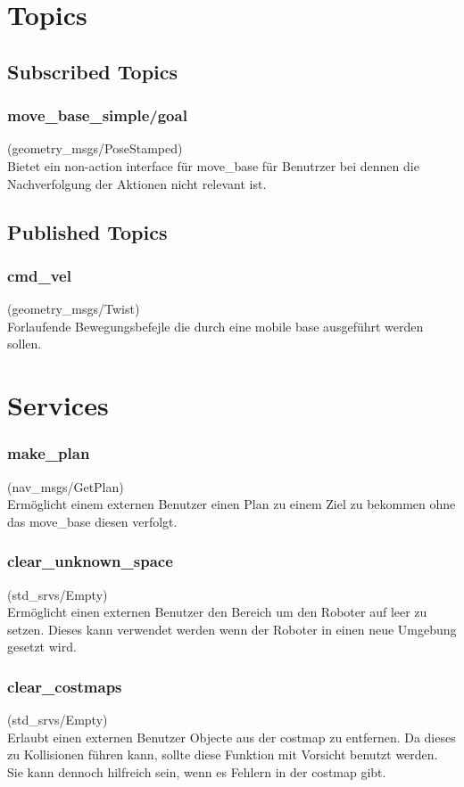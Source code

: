 \documentclass[oribibl]{llncs}
\begin{document}
\section{Topics}
\subsection{Subscribed Topics}
\subsubsection{move\_base\_simple/goal} (geometry\_msgs/PoseStamped)\\
	Bietet ein non-action interface für move\_base für Benutrzer bei dennen die Nachverfolgung der Aktionen nicht relevant ist.
\subsection{Published Topics}
\subsubsection{cmd\_vel} (geometry\_msgs/Twist)\\
	Forlaufende Bewegungsbefejle die durch eine mobile base ausgeführt werden 	sollen.
	
\section{Services}
\subsubsection{make\_plan} (nav\_msgs/GetPlan)\\
	Ermöglicht einem externen Benutzer einen Plan zu einem Ziel zu bekommen ohne 	das move\_base diesen verfolgt.
\subsubsection{clear\_unknown\_space} (std\_srvs/Empty)\\
	Ermöglicht einen externen Benutzer den Bereich um den Roboter auf leer zu setzen. 	Dieses kann verwendet werden wenn der Roboter in einen neue Umgebung gesetzt 	wird.
\subsubsection{clear\_costmaps} (std\_srvs/Empty)\\
	Erlaubt einen externen Benutzer Objecte aus der costmap zu entfernen. Da dieses 	zu Kollisionen führen kann, sollte diese Funktion mit Vorsicht benutzt werden. Sie 	kann dennoch hilfreich sein, wenn es Fehlern in der costmap gibt.
	
\end{document}
